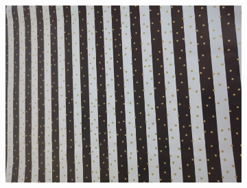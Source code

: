 \begin{figure}[h!tb]
\begin{subfigure}[b]{0.25\textwidth}
    \end{subfigure}%
    \begin{subfigure}[b]{0.25\textwidth}
        \centering
        \includegraphics[width=0.9\linewidth]{images/materials/giftpaper-cam}
    \end{subfigure}%


\end{figure}
